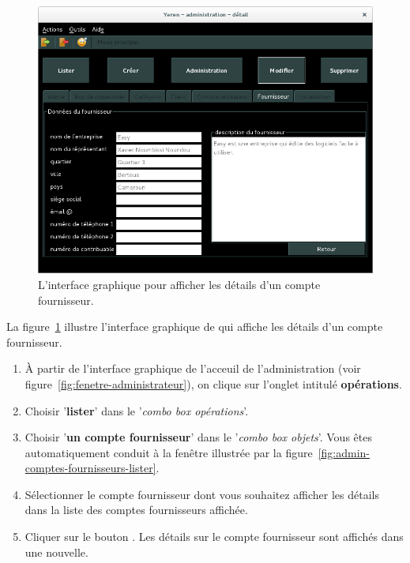 

\begin{figure}[!htpb]
	\centering
	\includegraphics[scale=0.45]{images/compte-fournisseur-afficher-details.png}
	\caption{L'interface graphique pour afficher les d\'etails
			d'un compte fournisseur.}
	\label{fig:admin-fournisseurs-afficher-details}
\end{figure}

La figure~\ref{fig:admin-fournisseurs-afficher-details}
illustre l'interface graphique de \yeren qui affiche
les d\'etails d'un compte fournisseur.

\begin{enumerate}[1)]
	\item \`A partir de l'interface graphique de l'acceuil de
		l'administration (voir figure~\ref{fig:fenetre-administrateur}),
		on clique sur l'onglet intitul\'e \textbf{op\'erations}. 
		
	\item Choisir '\textbf{lister}' dans le '\emph{combo box
		op\'erations}'.
		
	\item Choisir '\textbf{un compte fournisseur}' dans le
		'\emph{combo box objets}'. Vous \^etes automatiquement
		conduit \`a la fen\^etre illustr\'ee par la
		figure~\ref{fig:admin-comptes-fournisseurs-lister}.
		
	\item S\'electionner le compte fournisseur dont vous
		souhaitez afficher les d\'etails dans la liste des
		comptes fournisseurs affich\'ee.
		
	\item Cliquer sur le bouton . Les d\'etails
		sur le compte fournisseur sont affich\'es dans une nouvelle.
\end{enumerate}

